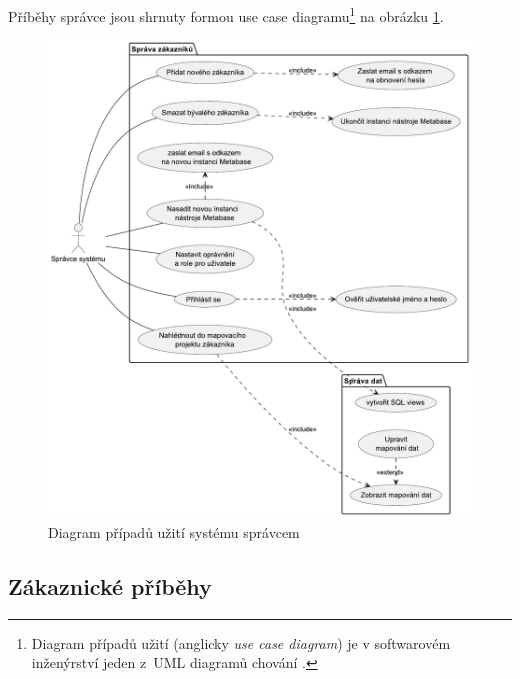 Příběhy správce jsou shrnuty formou use case diagramu\footnote{
Diagram případů užití (anglicky \textit{use case diagram}) je v softwarovém inženýrství jeden z~UML diagramů chování \cite{useCaseDiagWiki:online}.
}
na obrázku \ref{fig:admin-use-cases}.
\begin{figure}
    \centering
    \includegraphics[width=\linewidth]{img/Use Case Diagram - Správce systému (1).pdf}
    \caption{Diagram případů užití systému správcem}
    \label{fig:admin-use-cases}
\end{figure}

\subsection{Zákaznické příběhy}

